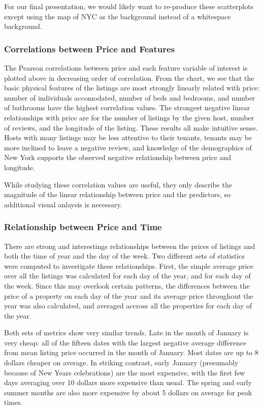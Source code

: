 \documentclass[11pt]{article}
\begin{document}
For our final presentation, we would likely want to re-produce these
scatterplots except using the map of NYC as the background instead of a
whitespace background.

\subsubsection{Correlations between Price and
Features}\label{correlations-between-price-and-features}

The Pearson correlations between price and each feature variable of
interest is plotted above in decreasing order of correlation. From the
chart, we see that the basic physical features of the listings are most
strongly linearly related with price: number of individuals accomodated,
number of beds and bedrooms, and number of bathrooms have the highest
correlation values. The strongest negative linear relationships with
price are for the number of listings by the given host, number of
reviews, and the longitude of the listing. These results all make
intuitive sense. Hosts with many listings may be less attentive to their
tenants, tenants may be more inclined to leave a negative review, and
knowledge of the demographics of New York supports the observed negative
relationship between price and longitude.

While studying these correlation values are useful, they only describe
the magnitude of the linear relationship between price and the
predictors, so additional visual anlaysis is necessary.

\subsubsection{Relationship between Price and
Time}\label{relationship-between-price-and-time}

There are strong and interestings relationships between the prices of
listings and both the time of year and the day of the week. Two
different sets of statistics were computed to investigate these
relationships. First, the simple average price over all the listings was
calculated for each day of the year, and for each day of the week. Since
this may overlook certain patterns, the differences between the price of
a property on each day of the year and its average price throughout the
year was also calculated, and averaged accross all the properties for
each day of the year.

Both sets of metrics show very similar trends. Late in the month of
January is very cheap: all of the fifteen dates with the largest
negative average difference from mean listing price occurred in the
month of January. Most dates are up to 8 dollars cheaper on average. In
striking contrast, early January (presumably because of New Years
celebrations) are the most expensive, with the first few days averaging
over 10 dollars more expensive than usual. The spring and early summer
months are also more expensive by about 5 dollars on average for peak
times.
\end{document}

